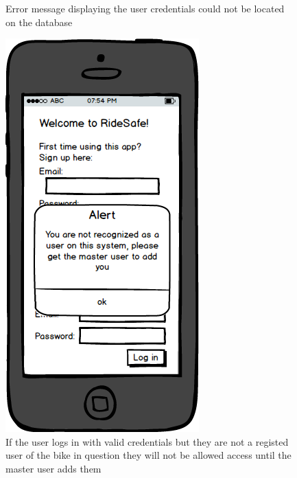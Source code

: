 \documentclass[a4paper]{report}
\begin{document}
{\begin{figure}
\caption{Error message displaying the user credentials could not be located on the database}
\end{figure}
\clearpage
\begin{figure}
\centering
\includegraphics[scale=0.9]{figures/prototype_2/unrecognised_warn}
\caption{If the user logs in with valid credentials but they are not a registed user of the bike in question they will not be allowed access until the master user adds them}
\end{figure}
\clearpage
\begin{figure}
\centering

\end{figure}}
\end{document}
